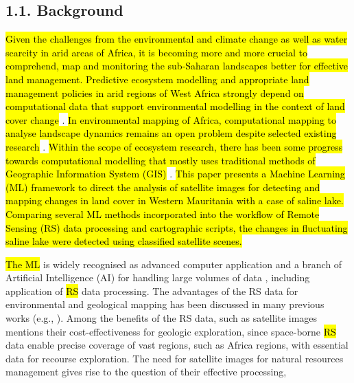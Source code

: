 \documentclass[12pt,a4paper,oneside]{article}
\def \newpar{\vspace{6pt}}
\begin{document}
\subsection*{1.1. Background}

\newpar \hl{Given the challenges from the environmental and climate change as well as water scarcity in arid areas of Africa, it is becoming more and more crucial to comprehend, map and monitoring the sub-Saharan landscapes better for effective land management. Predictive ecosystem modelling and appropriate land management policies in arid regions of West Africa strongly depend on computational data that support environmental modelling in the context of land cover change} \citep{BOJER2024121394,PILLAY2021106595,Lemenkova202414}. \hl{In environmental mapping of Africa, computational mapping to analyse landscape dynamics remains an open problem despite selected existing research} \citep{ALI2024113123,WALTHER2021146093,TWUMASIANKRAH2024176219,Lemenkova202413}. \hl{Within the scope of ecosystem research, there has been some progress towards computational modelling that mostly uses traditional methods of Geographic Information System (GIS)} \citep{DUNGA2024108989,EBRAHIM2024101374,SHOKO2024103796,Lemenkova202412,Holloway}. \hl{This paper presents a Machine Learning (ML) framework to direct the analysis of satellite images for detecting and mapping changes in land cover in Western Mauritania with a case of saline lake. Comparing several ML methods incorporated into the workflow of Remote Sensing (RS) data processing and cartographic scripts, the changes in fluctuating saline lake were detected using classified satellite scenes.}

\newpar \hl{The ML} is widely recognised as advanced computer application and a branch of Artificial Intelligence (AI) for handling large volumes of data \citep{YANG2024102087,RATHORE2016122,CEDRIC2022100049}, including application of \hl{RS} data processing. The advantages of the RS data for environmental and geological mapping has been discussed in many previous works (e.g., \citep{Parajuli,Niang2022,Lemenkova202321,Ashpole}). Among the benefits of the RS data, such as satellite images \citep{GRANDJEAN2006220} mentions their cost-effectiveness for geologic exploration, since space-borne \hl{RS} data enable precise coverage of vast regions, such as Africa regions, with essential data for recourse exploration. The need for satellite images for natural resources management gives rise to the question of their effective processing,
\end{document}
